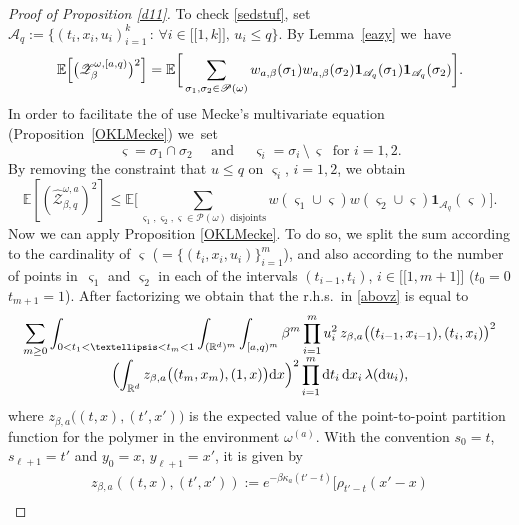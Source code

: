 \documentclass[11pt]{article}
\numberwithin{equation}{section}
\let\mathcal\mathscr
\newcommand{\lint}{\mathopen{[\![}}
\newcommand{\rint}{\mathclose{]\!]}}
\theoremstyle{definition}
\newcommand{\dd}{\mathrm{d}}
\newcommand{\ind}{\mathbf{1}}
\newcommand{\cA}{{\ensuremath{\mathcal A}} }
\newcommand{\cP}{{\ensuremath{\mathcal P}} }
\newcommand{\cZ}{{\ensuremath{\mathcal Z}} }
\newcommand{\bbE}{{\ensuremath{\mathbb E}} }
\newcommand{\bbR}{{\ensuremath{\mathbb R}} }
\let\gb\beta
\let\go\omega
\begin{document}
\begin{proof}[Proof of Proposition \ref{d11}]
To check \eqref{sedstuf}, set
$\cA_q:=\{ (t_i,x_i,u_i)^k_{i=1} \, : \, \forall i\in \lint 1,k\rint,\, u_i\le q \}$.
By Lemma~\ref{eazy} we~have
\begin{equation}
\bbE \Bigl[ \bigl(\cZ^{\go,[a,q)}_{\beta} \bigr)^2 \Bigr]= \bbE \bigg[ \sum_{\sigma_1, \sigma_2 \in \cP(\go)} w_{a,\beta}(\sigma_1)w_{a,\beta}(\sigma_2) \ind_{\cA_q}(\sigma_1)\ind_{\cA_q}(\sigma_2) \bigg].
\end{equation}
In order to facilitate the of use Mecke's multivariate equation (Proposition~\ref{OKLMecke}) we~set%
\begin{equation}\label{lanotat}
\varsigma=\sigma_1 \cap \sigma_2 \quad \text{ and } \quad \varsigma_i=\sigma_i\, \setminus\, \varsigma \ \text{ for } i=1,2.
\end{equation}
By removing the constraint that $u\leq q$ on $\varsigma_i$, $i=1,2$, we obtain
\begin{equation}\label{abovz}
\bbE \left[ (\hat \cZ^{\go,a}_{\beta,q})^2 \right]\le
\bbE \bigg[ \sum_{\varsigma_1, \varsigma_2, \varsigma\in \cP(\go) \text{ disjoints}} w(\varsigma_1\cup \varsigma)w(\varsigma_2\cup \varsigma) \ind_{\cA_q}(\varsigma) \bigg].
\end{equation}
Now we can apply
Proposition \ref{OKLMecke}. To do so, we split the sum according to the cardinality of $\varsigma$ ($=\{ (t_i,x_i,u_i)\}^m_{i=1}$), and also according to the number of points in~$\varsigma_1$ and $\varsigma_2$
in each of the intervals $(t_{i-1},t_i)$, $i\in\lint 1, m+1\rint$ ($t_0=0$ $t_{m+1}=1$).
After factorizing
we obtain that the r.h.s.\ in \eqref{abovz} is equal to\vspace*{-5pt}
\begin{multline}\label{zruc}
\sum_{m \ge 0} \int_{0<t_1<\dots<t_m<1} \int_{ (\bbR^d)^m} \int_{[a,q)^m} \gb^{m}
\prod_{i=1}^{m} u_i^2 \, z_{\beta,a}\bigl((t_{i-1},x_{i-1}), (t_{i},x_{i}) \bigr)^2
\\[-5pt]
\Bigl(\int_{\bbR^d} z_{\beta,a}\bigl((t_m,x_m), (1,x) \bigr) \dd x \Bigr)^2 \prod_{i=1}^m \dd t_i\, \dd x_i\, \lambda(\dd u_i),
\end{multline}
where $z_{\beta,a}\bigl((t,x), (t',x') \bigr)$ is the expected value of the point-to-point partition function for the polymer in the environment $\go^{(a)}$. With the convention $s_0=t$, $s_{\ell+1}=t'$ and $y_0=x$, $y_{\ell+1} =x'$, it is given by\vspace*{-5pt}
\begin{multline}\label{zruc2}
z_{\beta,a} ((t,x), (t',x'))
:= e^{ -\gb \kappa_a (t'-t)}
\bigg[ \rho_{t'-t}(x'-x)\\

\end{multline}
\end{proof}
\end{document}
